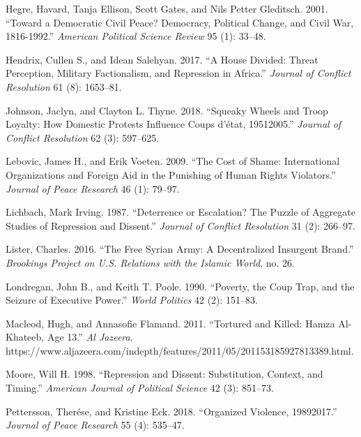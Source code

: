 \documentclass[12pt,]{article}
\theoremstyle{definition}
\theoremstyle{definition}
\theoremstyle{definition}
\theoremstyle{remark}
\begin{document}
\leavevmode\hypertarget{ref-Hegre2001}{}%
Hegre, Havard, Tanja Ellison, Scott Gates, and Nils Petter Gleditsch.
2001. ``Toward a Democratic Civil Peace? Democracy, Political Change,
and Civil War, 1816-1992.'' \emph{American Political Science Review} 95
(1): 33--48.

\leavevmode\hypertarget{ref-Hendrix2017}{}%
Hendrix, Cullen S., and Idean Salehyan. 2017. ``A House Divided: Threat
Perception, Military Factionalism, and Repression in Africa.''
\emph{Journal of Conflict Resolution} 61 (8): 1653--81.

\leavevmode\hypertarget{ref-Johnson2018}{}%
Johnson, Jaclyn, and Clayton L. Thyne. 2018. ``Squeaky Wheels and Troop
Loyalty: How Domestic Protests Influence Coups d'état, 19512005.''
\emph{Journal of Conflict Resolution} 62 (3): 597--625.

\leavevmode\hypertarget{ref-Lebovic2009}{}%
Lebovic, James H., and Erik Voeten. 2009. ``The Cost of Shame:
International Organizations and Foreign Aid in the Punishing of Human
Rights Violators.'' \emph{Journal of Peace Research} 46 (1): 79--97.

\leavevmode\hypertarget{ref-Lichbach1987}{}%
Lichbach, Mark Irving. 1987. ``Deterrence or Escalation? The Puzzle of
Aggregate Studies of Repression and Dissent.'' \emph{Journal of Conflict
Resolution} 31 (2): 266--97.

\leavevmode\hypertarget{ref-Lister2016}{}%
Lister, Charles. 2016. ``The Free Syrian Army: A Decentralized Insurgent
Brand.'' \emph{Brookings Project on U.S. Relations with the Islamic
World}, no. 26.

\leavevmode\hypertarget{ref-Londregan1990}{}%
Londregan, John B., and Keith T. Poole. 1990. ``Poverty, the Coup Trap,
and the Seizure of Executive Power.'' \emph{World Politics} 42 (2):
151--83.

\leavevmode\hypertarget{ref-Macleod2011}{}%
Macleod, Hugh, and Annasofie Flamand. 2011. ``Tortured and Killed: Hamza
Al-Khateeb, Age 13.'' \emph{Al Jazeera}.
https://www.aljazeera.com/indepth/features/2011/05/201153185927813389.html.

\leavevmode\hypertarget{ref-Moore1998}{}%
Moore, Will H. 1998. ``Repression and Dissent: Substitution, Context,
and Timing.'' \emph{American Journal of Political Science} 42 (3):
851--73.

\leavevmode\hypertarget{ref-Pettersson2018}{}%
Pettersson, Therése, and Kristine Eck. 2018. ``Organized Violence,
19892017.'' \emph{Journal of Peace Research} 55 (4): 535--47.
\end{document}
